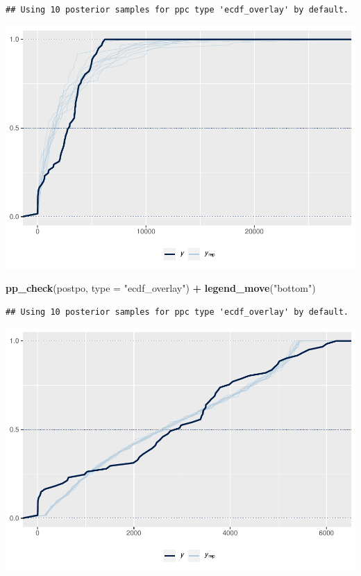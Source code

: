 \documentclass[]{article}
\newenvironment{Shaded}{\begin{snugshade}}{\end{snugshade}}
\newcommand{\DataTypeTok}[1]{\textcolor[rgb]{0.13,0.29,0.53}{#1}}
\newcommand{\KeywordTok}[1]{\textcolor[rgb]{0.13,0.29,0.53}{\textbf{#1}}}
\newcommand{\NormalTok}[1]{#1}
\newcommand{\OperatorTok}[1]{\textcolor[rgb]{0.81,0.36,0.00}{\textbf{#1}}}
\newcommand{\StringTok}[1]{\textcolor[rgb]{0.31,0.60,0.02}{#1}}
\begin{document}
\begin{verbatim}
## Using 10 posterior samples for ppc type 'ecdf_overlay' by default.
\end{verbatim}

\includegraphics{Assignment2_Yuyue_Hua_files/figure-latex/unnamed-chunk-8-1.pdf}

\begin{Shaded}
\begin{Highlighting}[]
\KeywordTok{pp_check}\NormalTok{(postpo, }\DataTypeTok{type =} \StringTok{"ecdf_overlay"}\NormalTok{) }\OperatorTok{+}\StringTok{ }\KeywordTok{legend_move}\NormalTok{(}\StringTok{"bottom"}\NormalTok{)}
\end{Highlighting}
\end{Shaded}

\begin{verbatim}
## Using 10 posterior samples for ppc type 'ecdf_overlay' by default.
\end{verbatim}

\includegraphics{Assignment2_Yuyue_Hua_files/figure-latex/unnamed-chunk-8-2.pdf}
\end{document}

